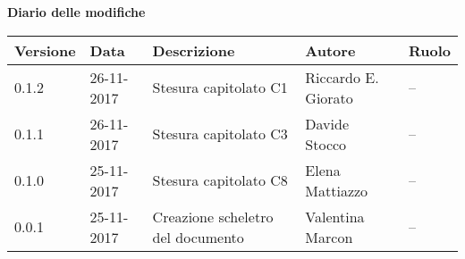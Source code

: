 \documentclass[main.tex]{subfiles}
\begin{document}
\huge \bfseries Diario delle modifiche\\
\begin{table}[htbp]
	\centering
	\renewcommand\arraystretch{1.2}

	\begin{tabularx}{\textwidth}{p{2cm}|p{2cm}|p{4cm}|p{2cm}|p{3cm}}
		\hline
		\textbf{Versione} & \textbf{Data} & \textbf{Descrizione} & \textbf{Autore} & \textbf{Ruolo}\\

		\hline
		0.1.2 & 26-11-2017 & Stesura capitolato C1 & Riccardo E. Giorato & -- \\
		
		\hline
		0.1.1 & 26-11-2017 & Stesura capitolato C3 & Davide Stocco & -- \\
		
		\hline
		0.1.0 & 25-11-2017 & Stesura capitolato C8 & Elena Mattiazzo & -- \\
		
		\hline
		0.0.1 & 25-11-2017 & Creazione scheletro del documento & Valentina Marcon & -- \\
		\hline
	
	\end{tabularx}

\end{table}
\end{document}
